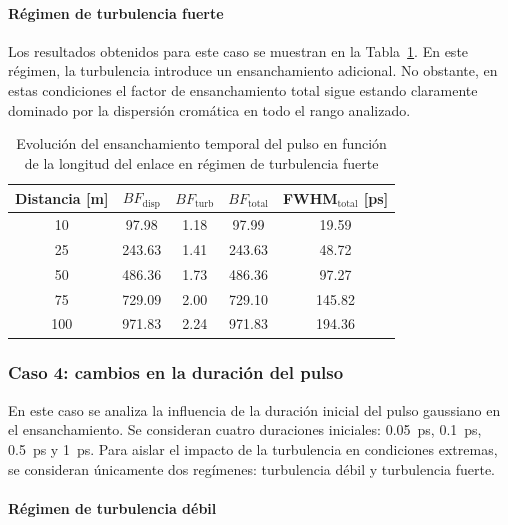 \paragraph{Régimen de turbulencia fuerte}

Los resultados obtenidos para este caso se muestran en la Tabla~\ref{tabla_oceano_longitud_fuerte}. En este régimen, la turbulencia introduce un ensanchamiento adicional. No obstante, en estas condiciones el factor de ensanchamiento total sigue estando claramente dominado por la dispersión cromática en todo el rango analizado.

\begin{table}[H]
\centering
\hspace*{-0.8cm}
\renewcommand{\arraystretch}{1.2}
\begin{tabular}{|c|c|c|c|c|}
\hline
\textbf{Distancia [m]} &
\textbf{$BF_{\mathrm{disp}}$} &
\textbf{$BF_{\mathrm{turb}}$} &
\textbf{$BF_{\mathrm{total}}$} &
\textbf{FWHM$_{\mathrm{total}}$ [ps]} \\
\hline
10  & 97.98  & 1.18  & 97.99  & 19.59 \\
25  & 243.63 & 1.41  & 243.63 & 48.72 \\
50  & 486.36 & 1.73 & 486.36 & 97.27 \\
75  & 729.09 & 2.00  & 729.10 & 145.82 \\
100 & 971.83 & 2.24  & 971.83 & 194.36 \\
\hline
\end{tabular}
\caption{ Evolución del ensanchamiento temporal del pulso en función de la longitud del enlace en régimen de turbulencia fuerte}
\label{tabla_oceano_longitud_fuerte}
\end{table}

\subsubsection*{Caso 4: cambios en la duración del pulso}

En este caso se analiza la influencia de la duración inicial del pulso gaussiano en el ensanchamiento. Se consideran cuatro duraciones iniciales: \SI{0.05}{\pico\second}, \SI{0.1}{\pico\second}, \SI{0.5}{\pico\second} y \SI{1}{\pico\second}. Para aislar el impacto de la turbulencia en condiciones extremas, se consideran únicamente dos regímenes: turbulencia débil y turbulencia fuerte.

\paragraph{Régimen de turbulencia débil}


